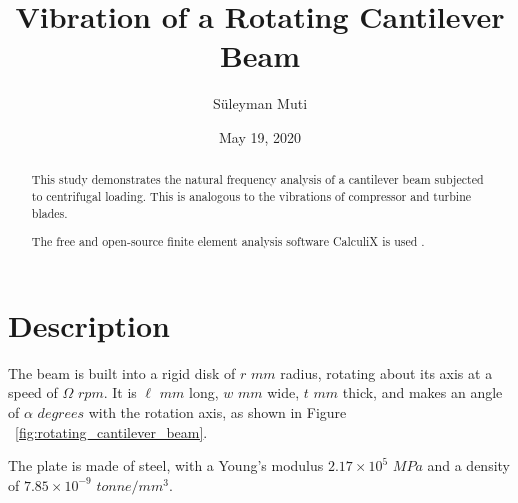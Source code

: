 \documentclass[12pt, a4paper, twoside]{article}
\title{Vibration of a Rotating Cantilever Beam}
\author{Süleyman Muti}
\date{May 19, 2020}
\begin{document}
\maketitle


\begin{abstract}
	
This study demonstrates the natural frequency analysis of a cantilever beam subjected to centrifugal loading. This is analogous to the vibrations of compressor and turbine blades.

The free and open-source finite element analysis software CalculiX is used \cite{CalculiX_website}.

\end{abstract}


\section{Description}

The beam is built into a rigid disk of $r$ $mm$ radius, rotating about its axis at a speed of $\Omega$ $rpm$. It is $\ell$ $mm$ long, $w$ $mm$ wide, $t$ $mm$ thick, and makes an angle of $\alpha$ $degrees$ with the rotation axis, as shown in Figure ~\ref{fig:rotating_cantilever_beam}.

The plate is made of steel, with a Young's modulus $2.17 \times 10^{5}$ $MPa$ and a density of $7.85 \times 10^{-9}$ $tonne/mm^3$.
\end{document}
